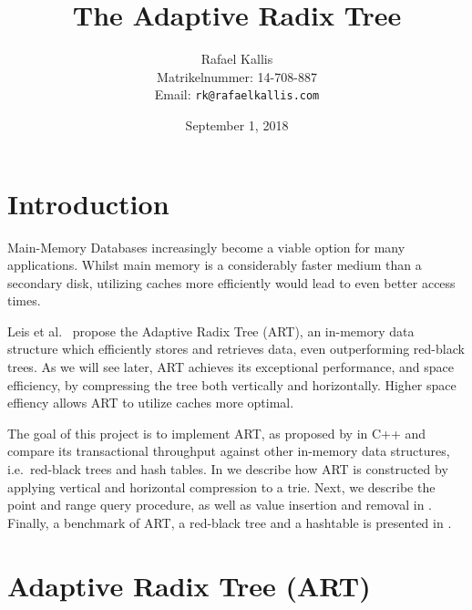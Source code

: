 \documentclass[abstracton,12pt]{scrartcl}
\title{The Adaptive Radix Tree}
\author{
    Rafael Kallis\\[-5pt]
    \scriptsize Matrikelnummer: 14-708-887\\[-5pt]
    \scriptsize Email: \texttt{rk@rafaelkallis.com}
}
\date{\vspace*{2cm}September 1, 2018}
\theoremstyle{definition}
\begin{document}
\maketitle





\newpage
\section{Introduction}

Main-Memory Databases increasingly become a viable option for many applications.
Whilst main memory is a considerably faster medium than a secondary disk, 
utilizing caches more efficiently would lead to even better access times.

Leis et al.\ \cite{leis2013adaptive} propose the Adaptive Radix Tree (ART), an in-memory
data structure which efficiently stores and retrieves data, even outperforming
red-black trees.
As we will see later, ART achieves its exceptional performance, and space
efficiency, by compressing the tree both vertically and horizontally.
Higher space effiency allows ART to utilize caches more optimal.

The goal of this project is to implement ART, as proposed by 
\cite{leis2013adaptive} in C++ and compare its transactional throughput
against other in-memory data structures, i.e.\ red-black trees and hash tables.
In  we describe how ART is constructed by applying 
vertical and horizontal compression to a trie.
Next, we describe the point and range query procedure, as well as 
value insertion and removal in .
Finally, a benchmark of ART, a red-black tree and a hashtable
is presented in .

\section{Adaptive Radix Tree (ART)}
\label{sec:art}
\end{document}

